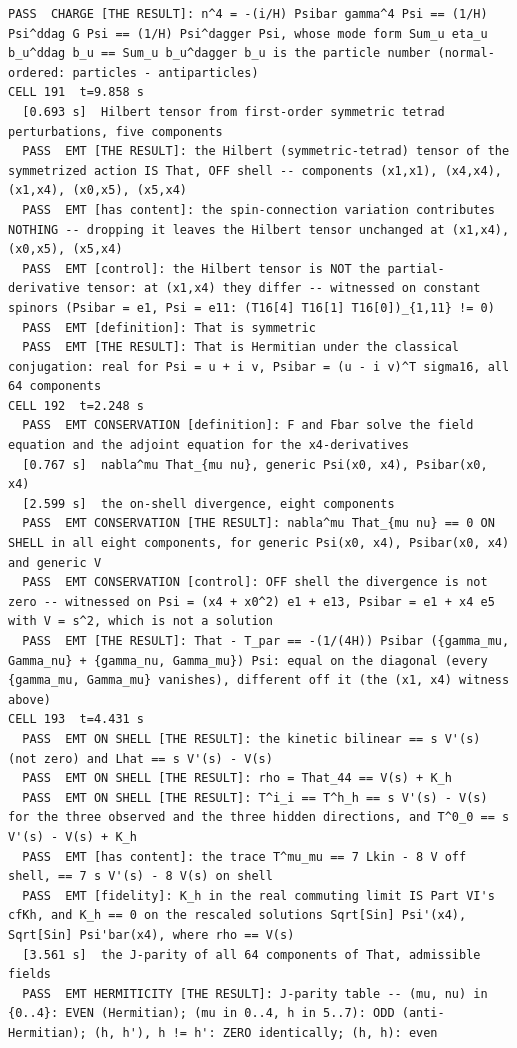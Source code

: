 \begin{Verbatim}[fontsize=\scriptsize]
  PASS  CHARGE [THE RESULT]: n^4 = -(i/H) Psibar gamma^4 Psi == (1/H) Psi^ddag G Psi == (1/H) Psi^dagger Psi, whose mode form Sum_u eta_u b_u^ddag b_u == Sum_u b_u^dagger b_u is the particle number (normal-ordered: particles - antiparticles)
CELL 191  t=9.858 s
  [0.693 s]  Hilbert tensor from first-order symmetric tetrad perturbations, five components
  PASS  EMT [THE RESULT]: the Hilbert (symmetric-tetrad) tensor of the symmetrized action IS That, OFF shell -- components (x1,x1), (x4,x4), (x1,x4), (x0,x5), (x5,x4)
  PASS  EMT [has content]: the spin-connection variation contributes NOTHING -- dropping it leaves the Hilbert tensor unchanged at (x1,x4), (x0,x5), (x5,x4)
  PASS  EMT [control]: the Hilbert tensor is NOT the partial-derivative tensor: at (x1,x4) they differ -- witnessed on constant spinors (Psibar = e1, Psi = e11: (T16[4] T16[1] T16[0])_{1,11} != 0)
  PASS  EMT [definition]: That is symmetric
  PASS  EMT [THE RESULT]: That is Hermitian under the classical conjugation: real for Psi = u + i v, Psibar = (u - i v)^T sigma16, all 64 components
CELL 192  t=2.248 s
  PASS  EMT CONSERVATION [definition]: F and Fbar solve the field equation and the adjoint equation for the x4-derivatives
  [0.767 s]  nabla^mu That_{mu nu}, generic Psi(x0, x4), Psibar(x0, x4)
  [2.599 s]  the on-shell divergence, eight components
  PASS  EMT CONSERVATION [THE RESULT]: nabla^mu That_{mu nu} == 0 ON SHELL in all eight components, for generic Psi(x0, x4), Psibar(x0, x4) and generic V
  PASS  EMT CONSERVATION [control]: OFF shell the divergence is not zero -- witnessed on Psi = (x4 + x0^2) e1 + e13, Psibar = e1 + x4 e5 with V = s^2, which is not a solution
  PASS  EMT [THE RESULT]: That - T_par == -(1/(4H)) Psibar ({gamma_mu, Gamma_nu} + {gamma_nu, Gamma_mu}) Psi: equal on the diagonal (every {gamma_mu, Gamma_mu} vanishes), different off it (the (x1, x4) witness above)
CELL 193  t=4.431 s
  PASS  EMT ON SHELL [THE RESULT]: the kinetic bilinear == s V'(s) (not zero) and Lhat == s V'(s) - V(s)
  PASS  EMT ON SHELL [THE RESULT]: rho = That_44 == V(s) + K_h
  PASS  EMT ON SHELL [THE RESULT]: T^i_i == T^h_h == s V'(s) - V(s) for the three observed and the three hidden directions, and T^0_0 == s V'(s) - V(s) + K_h
  PASS  EMT [has content]: the trace T^mu_mu == 7 Lkin - 8 V off shell, == 7 s V'(s) - 8 V(s) on shell
  PASS  EMT [fidelity]: K_h in the real commuting limit IS Part VI's cfKh, and K_h == 0 on the rescaled solutions Sqrt[Sin] Psi'(x4), Sqrt[Sin] Psi'bar(x4), where rho == V(s)
  [3.561 s]  the J-parity of all 64 components of That, admissible fields
  PASS  EMT HERMITICITY [THE RESULT]: J-parity table -- (mu, nu) in {0..4}: EVEN (Hermitian); (mu in 0..4, h in 5..7): ODD (anti-Hermitian); (h, h'), h != h': ZERO identically; (h, h): even

\end{Verbatim}
